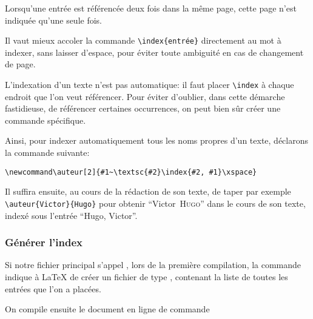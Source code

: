 
 Lorsqu'une entrée est référencée deux fois dans la même page, cette page n'est indiquée qu'une seule fois. 

\begin{attention}
Il vaut mieux accoler la commande \verb+\index{entrée}+ directement au  mot à indexer, sans laisser d'espace, pour éviter toute ambiguité en cas de changement de page.

\end{attention}

L'indexation d'un texte n'est pas automatique: il faut placer \verb+\index+ à chaque endroit  que l'on veut référencer. Pour éviter d'oublier, dans cette démarche fastidieuse, de référencer certaines occurrences, on  peut bien sûr créer une commande  spécifique.

Ainsi, pour indexer automatiquement tous les noms propres d'un texte, déclarons la commande suivante:\label{indexauteur}
\begin{verbatim}
\newcommand\auteur[2]{#1~\textsc{#2}\index{#2, #1}\xspace}
\end{verbatim}
\renewcommand\auteur[2]{#1~\textsc{#2}\index{#2, #1}\xspace}

Il suffira ensuite, au cours de la rédaction de son texte, de taper par exemple \verb|\auteur{Victor}{Hugo}| pour obtenir \enquote{\auteur{Victor}{Hugo}} dans le cours de son texte, indexé sous l'entrée \enquote{Hugo, Victor}.


\subsubsection{Générer l'index}

Si notre fichier principal s'appel , lors de la première compilation, la commande  indique à \LaTeX{} de créer un fichier de type , contenant la liste de toutes les entrées que l'on a placées. 
 



On compile ensuite le document en ligne de commande 

